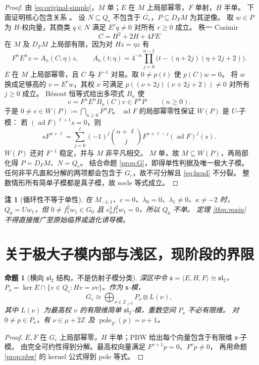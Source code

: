 \documentclass[UTF8,11pt,a4paper,fontset=fandol]{ctexart}
\theoremstyle{upright}
\newtheorem{proposition}[theorem]{命题}
\newtheorem{remark}[theorem]{注}
\newcommand{\Z}{\mathbb Z}
\newcommand{\s}{\mathfrak s}
\newcommand{\slc}{\mathfrak{sl}_2}
\DeclareMathOperator{\ad}{ad}
\DeclareMathOperator{\pole}{pole}
\begin{document}
\begin{proof}
由 \eqref{eq:original-simple}，$M$ 单；$E$ 在 $M$ 上局部幂零，$F$ 单射，$H$ 半单。
下面证明核心包含关系 \cite[Section 2]{Addendum}。
设 $N\subseteq Q_c$ 不包含于 $G_c$，$P\subseteq D_FM$ 为其逆像。
取 $w\in P$ 为 $H$-权向量，其商类 $q\in N$ 满足 $E^rq\ne0$ 对所有 $r\ge0$ 成立。
秩一 Casimir
\[
C=H^2+2H+4FE
\]
在 $M$ 及 $D_FM$ 上局部有限，因为对 $Hz=\eta z$ 有
\[
F^nE^nz=A_n(C;\eta)z,
\qquad A_n(t;\eta)=4^{-n}\prod_{j=0}^{n-1}
\bigl(t-(\eta+2j)(\eta+2j+2)\bigr).
\]
$E$ 在 $M$ 上局部幂零，且 $C$ 与 $F^{-1}$ 对易。取 $0\ne p(t)$ 使 $p(C)w=0$。
将 $w$ 换成足够高的 $v=E^rw$，其权 $\nu$ 可满足
$p((\nu+2j)(\nu+2j+2))\ne0$ 对所有 $j\ge0$ 成立。
Bézout 恒等式给出多项式 $B_n$ 使
\[
v=F^nE^nB_n(C)v\in F^nP\qquad(n\ge0).
\]
于是 $0\ne v\in W(P):=\bigcap_{n\ge0}F^nP$。
$\ad F$ 的局部幂零性保证 $W(P)$ 是 $U$-子模：
若 $(\ad F)^{\ell+1}s=0$，则
\[
sF^{n+\ell}=\sum_{j=0}^{\ell}(-1)^j\binom{n+\ell}{j}
F^{n+\ell-j}(\ad F)^j(s).
\]
$W(P)$ 还对 $F^{-1}$ 稳定，并与 $M$ 非平凡相交。
$M$ 单，故 $M\subseteq W(P)$，再局部化得 $P=D_FM$、$N=Q_c$。
结合命题 \ref{prop:G}，即得单性判据及唯一极大子模。
任何非平凡直和分解的两项都会包含于 $G_c$，故不可分解且 \eqref{eq:head} 不分裂。
整数情形所有简单子模都是真子模，故 socle 等式成立。
\end{proof}

\begin{remark}[循环性不等于单性]
在 $M_{-1,1}$、$c=0$、$\lambda_0=0$、$\lambda_1\ne0$、$\kappa\ne-2$ 时，
$Q_0=Uw_1$，但 $0\ne f_1^2w_1\in G_0$ 且 $e_0^3f_1^2w_1=0$，所以 $Q_0$ 不单。
定理 \ref{thm:main} 不得直接推广至原始临界或退化诱导模。
\end{remark}

\section{关于极大子模内部与浅区，现阶段的界限}

\begin{proposition}[横向 $\slc$ 结构，不是仿射子模分类]\label{prop:sl2}
深区中令 $\s=\langle E,H,F\rangle\cong\slc$，
$P_\nu=\ker E\cap\{v\in Q_c:Hv=\nu v\}$。作为 $\s$-模，
\[
G_c\cong\bigoplus_{\nu\in\Z_{\ge0}}P_\nu\otimes L(\nu),
\]
其中 $L(\nu)$ 为最高权 $\nu$ 的有限维简单 $\slc$-模，重数空间 $P_\nu$ 不必有限维。
对 $0\ne p\in P_\nu$，有 $\nu\in\mu+2\Z$ 及 $\pole_F(p)=\nu+1$。
\end{proposition}
\begin{proof}
$E,F$ 在 $G_c$ 上局部幂零，$H$ 半单；PBW 给出每个向量包含于有限维 $\s$-子模。
由完全可约性得到分解。最高权向量满足 $F^{\nu+1}p=0$、$F^\nu p\ne0$，
再用命题 \ref{prop:pbw} 的 kernel 公式得到 pole 等式。
\end{proof}
\end{document}

